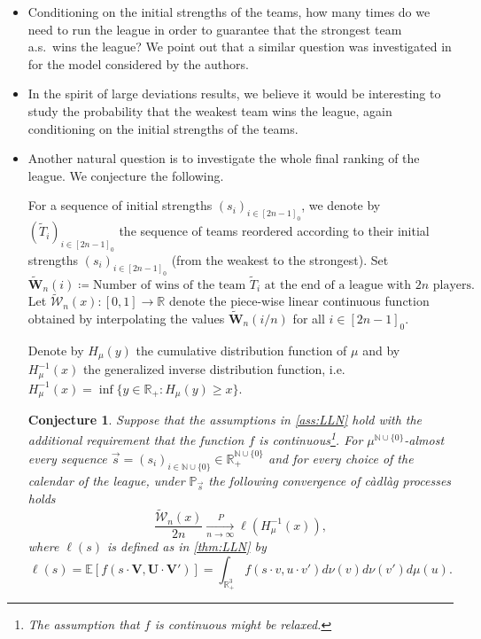 \documentclass[11pt,a4paper,oneside]{article}
\newtheorem{conj}[thm]{Conjecture}
\theoremstyle{definition}
\theoremstyle{remark}
\def\N{\mathbb{N}}
\def\E{\mathbb{E}}
\def\P{\mathbb{P}}
\def\R{\mathbb{R}}
\begin{document}
\begin{itemize}
	\item Conditioning on the initial strengths of the teams, how many times do we need to run the league in order to guarantee that the strongest team a.s.\ wins the league? We point out that a similar question was investigated in \cite{ben2007efficiency} for the model considered by the authors.
	
	
	\item In the spirit of large deviations results, we believe it would be interesting to study the probability that the weakest team wins the league, again conditioning on the initial strengths of the teams.
	
	
	\item Another natural question is to investigate the whole final ranking of the league. We conjecture the following.
	
	For a sequence of initial strengths $(s_i)_{i\in [2n-1]_0}$, we denote by  $(\tilde T_i)_{i\in [2n-1]_0}$ the sequence of teams reordered according to their initial strengths $(s_i)_{i\in [2n-1]_0}$ (from the weakest to the strongest). Set
	\begin{equation}
	\tilde{\bm W}_n(i)\coloneqq\text{Number of wins of the team }\tilde T_{i}\text{ at the end of a league with $2n$ players}.
	\end{equation}
	Let  $\tilde{\bm {\mathcal W}}_n(x):[0,1]\to \R$ denote the piece-wise linear continuous function obtained by interpolating the values $\tilde{\bm W}_n(i/n)$ for all $i\in [2n-1]_0$. 
	
	
	Denote by $H_{\mu}(y)$ the cumulative distribution function of $\mu$ and by $H_{\mu}^{-1}(x)$ the generalized inverse distribution function, i.e.\ $H_{\mu}^{-1}(x)=\inf\{y\in \R_{+}: H_{\mu}(y)\geq x \}$.
	\begin{conj}
		Suppose that the assumptions in \cref{ass:LLN} hold with the additional requirement that the function $f$ is continuous\footnote{The assumption that $f$ is continuous might be relaxed.}. For $\mu^{\N\cup\{0\}}$-almost every sequence $\vec{s}=(s_i)_{{i\in\N\cup\{0\}}}\in\R^{\N\cup\{0\}}_{+}$ and for every choice of the calendar of the league, under $\P_{\vec{s}}$ the following convergence of càdlàg processes holds
		\begin{equation}
		\frac{\tilde{\bm {\mathcal W}}_n(x)}{2n}\xrightarrow[n\to\infty]{P}\ell(H_{\mu}^{-1}(x)), 
		\end{equation}
		where $\ell(s)$ is defined as in \cref{thm:LLN} by
		\begin{equation}
		\ell(s)=\E\left[f\left(s\cdot\bm{V},\bm U\cdot\bm{V'}\right)\right]=\int_{\R^3_+} f\left(s\cdot v,u\cdot v'\right)d\nu(v)d\nu(v')d\mu(u).
		\end{equation}
	\end{conj}
	

\end{itemize}
\end{document}
